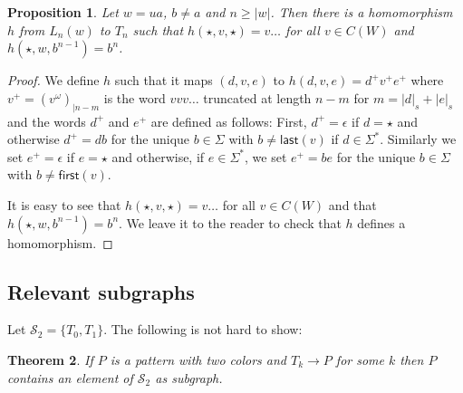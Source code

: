 \documentclass[a4paper]{article}
\newcommand{\size}[1]{{|{#1}|_s}}
\newcommand{\first}[1]{\mathsf{first}({#1})}
\newcommand{\last}[1]{\mathsf{last}({#1})}
\newcommand{\subpatterns}{\mathcal{S}}
\newtheorem{theorem}{Theorem}[section]
\newtheorem{proposition}[theorem]{Proposition}
\begin{document}
\begin{proposition}
 Let $w = u a$, $b \neq a$ and $n \geq |w|$. Then there is a
homomorphism $h$ from $L_n(w)$ to $T_n$ such that $h(\star,v,\star) = v
\dots$ for all $v \in C(W)$ and $h(\star,w,b^{n - 1}) = b^n$.
\end{proposition}
\begin{proof}
 We define $h$ such that it maps $(d,v,e)$ to $h(d,v,e) = d^+ v^+ e^+$
where $v^+ = (v^\omega)_{|n - m}$ is the word $v v v\dots$ truncated at
length $n - m$ for $m = \size{d} + \size{e}$ and the words $d^+$ and $e^+$
are defined as follows: First, $d^+ = \epsilon$ if $d = \star$ and
otherwise $d^+ = d b$ for the unique $b \in \Sigma$ with $b \neq
\last{v}$ if $d \in \Sigma^*$. Similarly we set $e^+ = \epsilon$ if $e =
\star$ and otherwise, if $e \in \Sigma^*$, we set $e^+ = b e$ for the
unique $b \in \Sigma$ with $b \neq \first{v}$.

It is easy to see that $h(\star,v,\star) = v
\dots$ for all $v \in C(W)$ and that $h(\star,w,b^{n - 1}) = b^n$. 
We leave it to the reader to check that $h$ defines a homomorphism.
\end{proof}


\subsection{Relevant subgraphs}

Let $\subpatterns_2 = \{T_0,T_1\}$. The following is not hard to show:
\begin{theorem}
 If $P$ is a pattern with two colors and $T_k \to P$ for some $k$ then
$P$ contains an element of $\subpatterns_2$ as subgraph.
\end{theorem}
\end{document}
